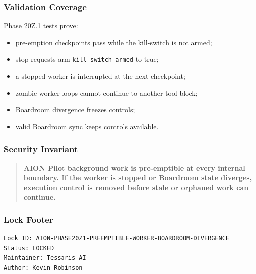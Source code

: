 \subsubsection{Validation Coverage}

Phase 20Z.1 tests prove:

\begin{itemize}
  \item pre-emption checkpoints pass while the kill-switch is not armed;
  \item stop requests arm \texttt{kill\_switch\_armed} to true;
  \item a stopped worker is interrupted at the next checkpoint;
  \item zombie worker loops cannot continue to another tool block;
  \item Boardroom divergence freezes controls;
  \item valid Boardroom sync keeps controls available.
\end{itemize}

\subsubsection{Security Invariant}

\begin{quote}
\textbf{AION Pilot background work is pre-emptible at every internal boundary. If the worker is stopped or Boardroom state diverges, execution control is removed before stale or orphaned work can continue.}
\end{quote}

\subsubsection{Lock Footer}

\begin{verbatim}
Lock ID: AION-PHASE20Z1-PREEMPTIBLE-WORKER-BOARDROOM-DIVERGENCE
Status: LOCKED
Maintainer: Tessaris AI
Author: Kevin Robinson
\end{verbatim}
